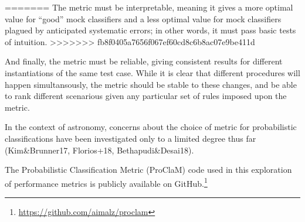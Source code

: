=======
The metric must be interpretable, meaning it gives a more optimal value for ``good'' mock classifiers and a less optimal value for mock classifiers plagued by anticipated systematic errors; in other words, it must pass basic tests of intuition.
>>>>>>> fb8f0405a7656f067ef60cd8c6b8ac07e9be411d

And finally, the metric must be reliable, giving consistent results for different instantiations of the same test case.
While it is clear that different procedures will happen simultansously, the metric should be stable to these changes, and be able to rank different scenarious given any particular set of rules imposed upon the metric.

In the context of astronomy, concerns about the choice of metric for probabilistic classifications have been investigated only to a limited degree thus far (Kim\&Brunner17, Florios+18, Bethapudi\&Desai18).

The Probabilistic Classification Metric (ProClaM) code used in this exploration of performance metrics is publicly available on GitHub.\footnote{\url{https://github.com/aimalz/proclam}}
